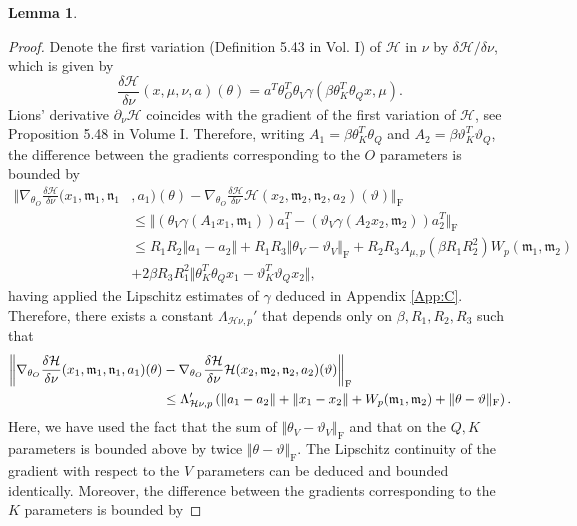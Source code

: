 \documentclass{article}
\newtheorem{lemma}[theorem]{Lemma}
\begin{document}
\begin{appendices}
\begin{lemma}
\end{lemma}
\begin{proof}
    Denote the first variation (Definition 5.43 in \cite{carmona2018probabilistic} Vol. I) of $\mathcal H$ in $\nu$ by $\delta \mathcal H/\delta \nu$, which is given by
    \[
    \frac{\delta \mathcal H}{\delta \nu}(x,\mu,\nu,a)(\theta)=a^T\theta_O^T\theta_V\gamma(\beta\theta_K^T\theta_Qx,\mu).
    \]
   Lions' derivative $\partial_\nu\mathcal H$ coincides with the gradient of the first variation of $\mathcal H$, see Proposition 5.48 in \cite{carmona2018probabilistic} Volume I. Therefore, writing $A_1=\beta \theta_K^T\theta_Q$ and $A_2=\beta\vartheta_K^T\vartheta_Q$, the difference between the gradients corresponding to the $O$ parameters is bounded by
    \begin{align*}
        \bigg\Vert \nabla_{\theta_O}\frac{\delta\mathcal H}{\delta \nu}(x_1,\mathfrak{m}_1,\mathfrak{n}_1&,a_1)(\theta)- \nabla_{\theta_O}\frac{\delta\mathcal H}{\delta \nu}\mathcal H(x_2,\mathfrak{m}_2,\mathfrak{n}_2,a_2)(\vartheta)\bigg\Vert_\mathrm{F}\\& \le \Vert (\theta_{V}\gamma(A_1x_1,\mathfrak{m}_1))a_1^T-(\vartheta_{V}\gamma(A_2x_2,\mathfrak{m}_2))a_2^T\Vert_\mathrm{F}\\
        & \le R_1R_2 \Vert a_1-a_2\Vert+R_1R_3\Vert \theta_V-\vartheta_V\Vert_\mathrm{F}+ R_2R_3 \Lambda_{\mu,p}(\beta R_1R_2^2)W_p(\mathfrak{m}_1,\mathfrak{m}_2)\\&+2\beta R_3R_1^2\Vert \theta_K^T\theta_Q x_1-\vartheta_K^T\vartheta_Q x_2\Vert,
    \end{align*}
    having applied the Lipschitz estimates of $\gamma$ deduced in Appendix \ref{App:C}.
    Therefore, there exists a constant $\Lambda_{\mathcal H\nu,p}'$ that depends only on $\beta,R_1,R_2,R_3$ such that
   \begin{align*}
       \bigg\Vert \nabla_{\theta_O}\frac{\delta\mathcal H}{\delta \nu}(x_1,\mathfrak{m}_1,\mathfrak{n}_1,a_1)(\theta)&- \nabla_{\theta_O}\frac{\delta\mathcal H}{\delta \nu}\mathcal H(x_2,\mathfrak{m}_2,\mathfrak{n}_2,a_2)(\vartheta)\bigg\Vert_\mathrm{F}\\& \le\Lambda_{\mathcal H\nu,p}'\left(\Vert a_1-a_2\Vert +\Vert x_1-x_2\Vert +W_p(\mathfrak{m}_1,\mathfrak{m}_2)+ \Vert \theta-\vartheta\Vert_\mathrm{F}  \right).\notag
   \end{align*}
   Here, we have used the fact that the sum of $\Vert \theta_V-\vartheta_V\Vert_\mathrm{F}$ and that on the $Q,K$ parameters is bounded above by twice $\Vert \theta-\vartheta\Vert_\mathrm{F}$. The Lipschitz continuity of the gradient with respect to the $V$ parameters can be deduced and bounded identically. Moreover, the difference between the gradients corresponding to the $K$ parameters is bounded by

\end{proof}
\end{appendices}
\end{document}
